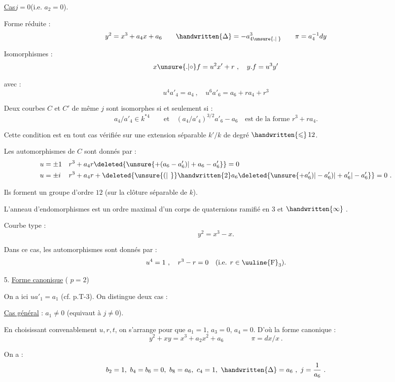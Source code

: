 
\uline{Cas}\quad $j=0$\quad (i.e. $a_{2}=0$).

Forme réduite :
\[
 y^{2}=x^{3}+a_{4}x+a_{6}\qquad \handwritten{\Delta}=-a_{4\unsure{.|\phantom{.}}}^{3}
 \qquad \pi=a_{4}^{-1}dy
\]

Isomorphismes :
\[
 x\unsure{\mathord{.}|\circ}f=u^{2}x'+r\ ,\quad
 y\mathord{.}f=u^{3}y'
\]

avec :
\[
 u^{4}a'_{4}=a_{4}\ ,\quad u^{6}a'_{6}=a_{6}+ra_{4}+r^{3}
\]

Deux courbes $C$ et $C'$ de même $j$ sont isomorphes si et seulement si :
\[
 a_{4}/a'_{4}\in k^{\ast 4}\qquad\text{et}\quad
 (a_{4}/a'_{4})^{3/2}a'_{6}-a_{6}\quad\text{est de la forme }r^{3}+ra_{4}.
\]

Cette condition est en tout cas vérifiée sur une extension séparable $k'/k$ de degré $\handwritten{\leqslant}\,12$.

Les automorphismes de $C$ sont donnés par :
\[
\begin{aligned}
u&=\pm 1 & r^{3}+a_{4}r&\deleted{\unsure{+(a_{6}-a'_{6})|+a_{6}-a'_{6}}}=0\\
u&=\pm i & r^{3}+a_{4}r&+\deleted{\unsure{(|\phantom{(}}}\handwritten{2}a_{6}\deleted{\unsure{+a'_{6})|-a'_{6})|+a'_{6}|-a'_{6}}}=0\ .
\end{aligned}
\]

Ils forment un groupe d'ordre $12$ (sur la clôture séparable de $k$).

L'anneau d'endomorphismes est un ordre maximal d'un corps de quaternions ramifié en $3$ et $\handwritten{\infty}$ .

Courbe type :
\[
 y^{2}=x^{3}-x.
\]

Dans ce cas, les automorphismes sont donnés par :
\[
 u^{4}=1\ ,\quad r^{3}-r=0\quad\text{(i.e. }r\in\text{\uuline{F}}_{3}\text{)}.
\]


5. \uline{Forme canonique} ( $p=2$)

On a ici $ua'_{1}=a_{1}$ (cf. p.T-3). On distingue deux cas :

\uline{Cas général} : $a_{1}\ne 0$ (equivaut à $j\ne 0$).

En choisissant convenablement $u,r,t$, on s'arrange pour que $a_{1}=1$, $a_{3}=0$, $a_{4}=0$. D'où la forme canonique :
\[
 y^{2}+xy=x^{3}+a_{2}x^{2}+a_{6}\qquad\qquad \pi=dx/x\ .
\]

On a :
\[
 b_{2}=1,\ b_{4}=b_{6}=0,\ b_{8}=a_{6},\ c_{4}=1,\ \handwritten{\Delta}=a_{6}\ ,\
 j=\frac{1}{a_{6}}\ .
\]

